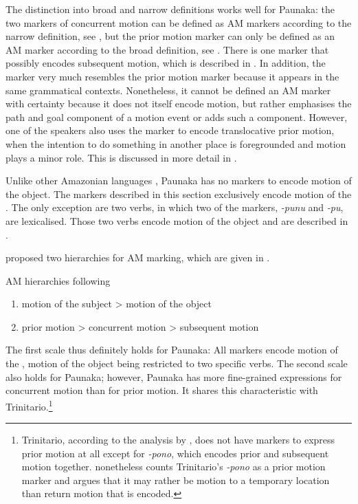 The distinction into broad and narrow definitions works well for Paunaka: the two markers of concurrent motion can be defined as AM markers according to the narrow definition, see , but the prior motion marker can only be defined as an AM marker according to the broad definition, see . There is one marker that possibly encodes subsequent motion, which is described in . In addition, the  marker very much resembles the prior motion marker because it appears in the same grammatical contexts. Nonetheless, it cannot be defined an AM marker with certainty because it does not itself encode motion, but rather emphasises the path and goal component of a motion event or adds such a component. However, one of the speakers also uses the marker to encode translocative prior motion, when the intention to do something in another place is foregrounded and motion plays a minor role. This is discussed in more detail in .

Unlike other Amazonian languages \citep[cf.][]{Guillaume2016}, Paunaka has no markers to encode motion of the object. The markers described in this section exclusively encode motion of the . The only exception are two verbs, in which two of the markers, \textit{-punu} and \textit{-pu}, are lexicalised. Those two verbs encode motion of the object and are described in .

\citet[83]{Guillaume2016} proposed two hierarchies for AM marking, which are given in .

\ea
\label{exfig:AMHierarchy}
\upshape AM hierarchies following \citet[83]{Guillaume2016}\\
\begin{enumerate}
\item motion of the subject > motion of the object
\item prior motion > concurrent motion > subsequent motion
\end{enumerate}
\z

The first scale thus definitely holds for Paunaka: All markers encode motion of the , motion of the object being restricted to two specific verbs.
The second scale also holds for Paunaka; however, Paunaka has more fine-grained expressions for concurrent motion than for prior motion. It shares this characteristic with Trinitario.\footnote{Trinitario, according to the analysis by \citet[140]{Rose2015}, does not have markers to express prior motion at all except for \textit{-pono}, which encodes prior and subsequent motion together. \citet[108, 117--118]{Guillaume2016} nonetheless counts Trinitario’s \textit{-pono} as a prior motion marker and argues that it may rather be motion to a temporary location than return motion that is encoded.} 

